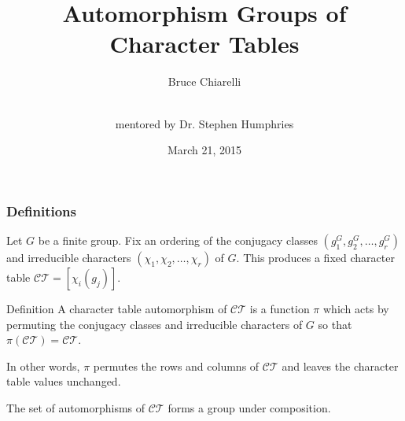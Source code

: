 \documentclass[xcolor=dvipsnames]{beamer}
\theoremstyle{remark}
\theoremstyle{plain}
\theoremstyle{definition}
\begin{document}
\title[Character Table Automorphisms]{Automorphism Groups of Character
Tables}
\author[ ]{Bruce Chiarelli \and\\ mentored by Dr. Stephen Humphries}
\date{March 21, 2015}

\begin{frame}
\titlepage
\end{frame}

\begin{frame}
\frametitle{Definitions}
  Let $G$ be a finite group. Fix an ordering of the conjugacy classes
  $(g_1^G,g_2^G,\ldots,g_r^G)$ and irreducible characters
  $(\chi_1,\chi_2,\ldots,\chi_r)$ of $G$. This produces a fixed
  character table $\mathcal{CT}=[\chi_i(g_j)]$. \pause
\begin{block}{Definition}
  A character table automorphism of $\mathcal{CT}$ is a function $\pi$
  which acts by permuting the conjugacy classes and irreducible
  characters of $G$ so that $\pi(\mathcal{CT})=\mathcal{CT}$.\pause

  In other words, $\pi$ permutes the rows and columns of
  $\mathcal{CT}$ and leaves the character table values unchanged.
\end{block}
\pause The set of automorphisms of $\mathcal{CT}$ forms a group under
composition.
\end{frame}
\end{document}
